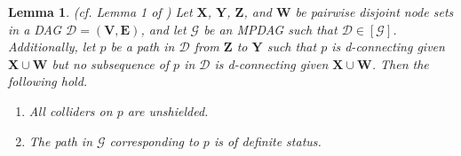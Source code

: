 \documentclass[11pt]{article}
\newtheorem{lemma}[theorem]{Lemma}
\newcommand{\mb}[1]{\mathbf{#1}}
\newcommand{\g}[1][G]{\mathcal{#1}}
\begin{document}
\begin{lemma}
\label{lem:do-helper1}
{\normalfont (cf. Lemma 1 of \cite{zhang2006causal})}
    Let $\mb{X}$, $\mb{Y}$, $\mb{Z}$, and $\mb{W}$ be pairwise disjoint node sets in a DAG $\g[D]=(\mb{V,E})$, and let $\g$ be an MPDAG such that $\g[D] \in [\g]$. Additionally, let $p$ be a path in $\g[D]$ from $\mb{Z}$ to $\mb{Y}$ such that $p$ is d-connecting given $\mb{X} \cup \mb{W}$ but no subsequence of $p$ in $\g[D]$ is d-connecting given $\mb{X} \cup \mb{W}$. Then the following hold.
    \begin{enumerate}[label=(\roman*)]
        \item\label{lem:do-helper1-one}
        All colliders on $p$ are unshielded.
        
        \item\label{lem:do-helper1-two}
        The path in $\g$ corresponding to $p$ is of definite status.
    \end{enumerate}
\end{lemma}
\end{document}
